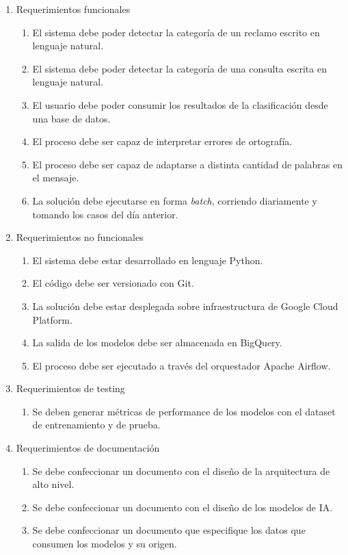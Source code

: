 \documentclass[
11pt, %
]{charter}
\begin{document}
\begin{enumerate}
	\item Requerimientos funcionales
		\begin{enumerate}
			\item El sistema debe poder detectar la categoría de un reclamo escrito en lenguaje natural.
			\item El sistema debe poder detectar la categoría de una consulta escrita en lenguaje natural.
			\item El usuario debe poder consumir los resultados de la clasificación desde una base de datos.
			\item El proceso debe ser capaz de interpretar errores de ortografía.
			\item El proceso debe ser capaz de adaptarse a distinta cantidad de palabras en el mensaje.
			\item La solución debe ejecutarse en forma \textit{batch}, corriendo diariamente y tomando los casos del día anterior.
		\end{enumerate}
	\item Requerimientos no funcionales
		\begin{enumerate}
			\item El sistema debe estar desarrollado en lenguaje Python.
			\item El código debe ser versionado con Git.
			\item La solución debe estar desplegada sobre infraestructura de Google Cloud Platform.
			\item La salida de los modelos debe ser almacenada en BigQuery.
			\item El proceso debe ser ejecutado a través del orquestador Apache Airflow.
		\end{enumerate}
	\item Requerimientos de testing
		\begin{enumerate}
			\item Se deben generar métricas de performance de los modelos con el dataset de entrenamiento y de prueba.
		\end{enumerate}
	\item Requerimientos de documentación
		\begin{enumerate}
			\item Se debe confeccionar un documento con el diseño de la arquitectura de alto nivel.
			\item Se debe confeccionar un documento con el diseño de los modelos de IA.
			\item Se debe confeccionar un documento que especifique los datos que consumen los modelos y su origen.
		\end{enumerate}
\end{enumerate}
\end{document}
